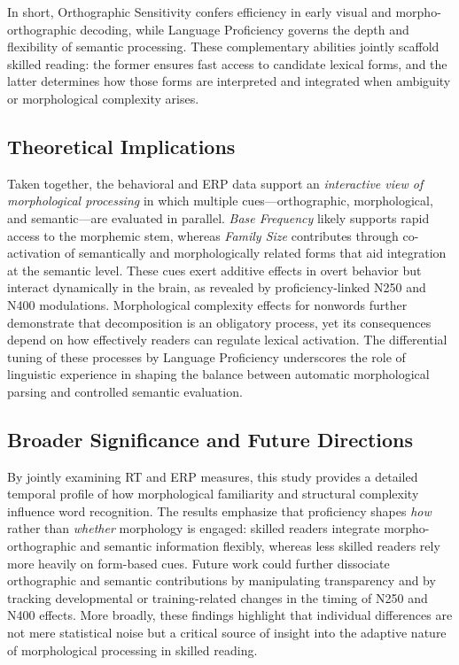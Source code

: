 \documentclass[preprint,12pt, authoryear, review]{elsarticle}
\begin{document}
In short, Orthographic Sensitivity confers efficiency in early visual and morpho-orthographic decoding, while Language Proficiency governs the depth and flexibility of semantic processing. These complementary abilities jointly scaffold skilled reading: the former ensures fast access to candidate lexical forms, and the latter determines how those forms are interpreted and integrated when ambiguity or morphological complexity arises.


\subsection{Theoretical Implications}

Taken together, the behavioral and ERP data support an \textit{interactive view of morphological processing} in which multiple cues—orthographic, morphological, and semantic—are evaluated in parallel. \textit{Base Frequency} likely supports rapid access to the morphemic stem, whereas \textit{Family Size} contributes through co-activation of semantically and morphologically related forms that aid integration at the semantic level. These cues exert additive effects in overt behavior but interact dynamically in the brain, as revealed by proficiency-linked N250 and N400 modulations. Morphological complexity effects for nonwords further demonstrate that decomposition is an obligatory process, yet its consequences depend on how effectively readers can regulate lexical activation. The differential tuning of these processes by Language Proficiency underscores the role of linguistic experience in shaping the balance between automatic morphological parsing and controlled semantic evaluation.

\subsection{Broader Significance and Future Directions}

By jointly examining RT and ERP measures, this study provides a detailed temporal profile of how morphological familiarity and structural complexity influence word recognition. The results emphasize that proficiency shapes \textit{how} rather than \textit{whether} morphology is engaged: skilled readers integrate morpho-orthographic and semantic information flexibly, whereas less skilled readers rely more heavily on form-based cues. Future work could further dissociate orthographic and semantic contributions by manipulating transparency and by tracking developmental or training-related changes in the timing of N250 and N400 effects. More broadly, these findings highlight that individual differences are not mere statistical noise but a critical source of insight into the adaptive nature of morphological processing in skilled reading.
\end{document}
